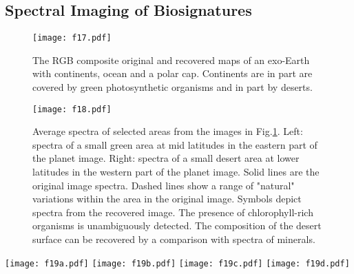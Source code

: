 \documentclass{emulateapj}
\begin{document}
\subsection{Spectral Imaging of Biosignatures}\label{sec:inve_bio}

\begin{figure}
\centering
\texttt{[image: f17.pdf]}
\caption{The RGB composite original and recovered maps of an exo-Earth with continents, ocean and a polar cap.
Continents are in part are covered by green photosynthetic organisms and in part by deserts.  
}
\label{fig:EN3000_exoearth_rgb}
\end{figure}

\begin{figure}
\centering
\texttt{[image: f18.pdf]}
\caption{Average spectra of selected areas from the images in Fig.\ref{fig:EN3000_exoearth_rgb}.
Left: spectra of a small green area at mid latitudes in the eastern part of the planet image.
Right: spectra of a small desert area at lower latitudes in the western part of the planet image.
Solid lines are the original image spectra. Dashed lines show a range of "natural" variations 
within the area in the original image. Symbols depict spectra from the recovered image.
The presence of chlorophyll-rich organisms is unambiguously detected. The composition of the desert surface
can be recovered by a comparison with spectra of minerals.
}
\label{fig:EN3000_exoearth_veg}
\end{figure}

\begin{figure*}
\centering
\texttt{[image: f19a.pdf]}
\texttt{[image: f19b.pdf]}
\texttt{[image: f19c.pdf]}
\texttt{[image: f19d.pdf]}
\caption{The same as Fig.~\ref{fig:EN3000} but for the input maps in the four RGB+NIR bands from 
an exo-Earth image shown in the top panel of Fig.~\ref{fig:EN3000_exoearth_rgb}. 
The RGB composite of the recovered images is shown in the bottom panel of Fig.~\ref{fig:EN3000_exoearth_rgb}. 
The map quality indexes are 
IR: IQ=82\%, SD=16\%;
R: IQ=86\%, SD=15\%;
G: IQ=88\%, SD=15\%;
B: IQ=86\%, SD=25\%.  
}
\label{fig:EN3000_exoearth_ir+rgb}
\end{figure*}
\end{document}
